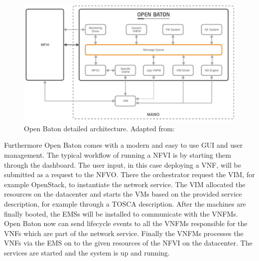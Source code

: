 \begin{figure}[H]
    \centering
    \includegraphics[width=\textwidth]{resources/images/open_baton_architecture.png}
    \caption[Open Baton detailed architecture]{Open Baton detailed architecture. Adapted from: \autocite{openBatonDoc}}
    \label{fig:open_baton_detailed_architecture}
\end{figure}

Furthermore Open Baton comes with a modern and easy to use \ac{GUI} and user management.
The typical workflow of running a \ac{NFVI} is by starting them through the dashboard.
The user input, in this case deploying a \ac{VNF}, will be submitted as a request to the \ac{NFVO}.
There the orchestrator request the \ac{VIM}, for example OpenStack, to instantiate the network service.
The \ac{VIM} allocated the resources on the datacenter and starts the \acp{VM} based on the provided service description, for example through a \ac{TOSCA} description.
After the machines are finally booted, the \acp{EMS} will be installed to communicate with the \acp{VNFM}.
Open Baton now can send lifecycle events to all the \acp{VNFM} responsible for the \acp{VNF} which are part of the network service.
Finally the \acp{VNFM} processes the \acp{VNF} via the \ac{EMS} on to the given resources of the \ac{NFVI} on the datacenter.
The services are started and the system is up and running.


